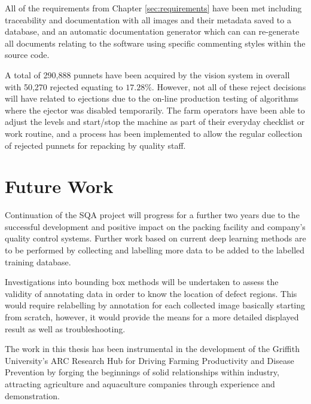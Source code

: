 \documentclass[fleqn,twoside,12pt]{report}
\begin{document}
All of the requirements from Chapter \ref{sec:requirements} have been met including traceability and documentation with all images and their metadata saved to a database, and an automatic documentation generator which can can re-generate all documents relating to the software using specific commenting styles within the source code.

A total of 290,888 punnets have been acquired by the vision system in overall with 50,270 rejected equating to $17.28\%$. However, not all of these reject decisions will have related to ejections due to the on-line production testing of algorithms where the ejector was disabled temporarily. The farm operators have been able to adjust the levels and start/stop the machine as part of their everyday checklist or work routine, and a process has been implemented to allow the regular collection of rejected punnets for repacking by quality staff.



\section{Future Work}

Continuation of the SQA project will progress for a further two years due to the successful development and positive impact on the packing facility and company's quality control systems. Further work based on current deep learning methods are to be performed by collecting and labelling more data to be added to the labelled training database. 

Investigations into bounding box methods will be undertaken to assess the validity of annotating data in order to know the location of defect regions. This would require relabelling by annotation for each collected image basically starting from scratch, however, it would provide the means for a more detailed displayed result as well as troubleshooting.

The work in this thesis has been instrumental in the development of the Griffith University's ARC Research Hub for Driving Farming Productivity and Disease Prevention by forging the beginnings of solid relationships within industry, attracting agriculture and aquaculture companies through experience and demonstration. 




\newpage


\end{document}
